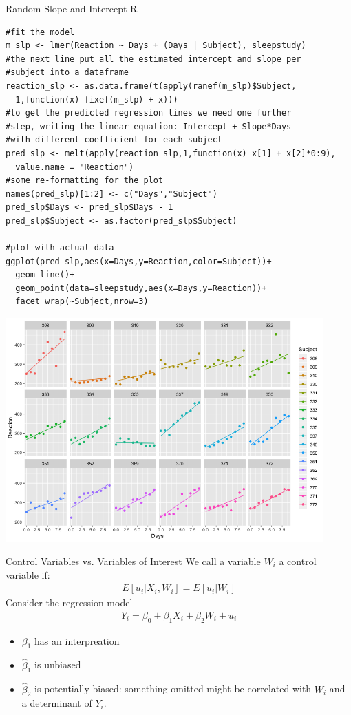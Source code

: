 \begin{frame}[fragile]{Random Slope and Intercept R}
\tiny
\begin{verbatim}
#fit the model
m_slp <- lmer(Reaction ~ Days + (Days | Subject), sleepstudy)
#the next line put all the estimated intercept and slope per
#subject into a dataframe
reaction_slp <- as.data.frame(t(apply(ranef(m_slp)$Subject,
  1,function(x) fixef(m_slp) + x)))
#to get the predicted regression lines we need one further
#step, writing the linear equation: Intercept + Slope*Days
#with different coefficient for each subject
pred_slp <- melt(apply(reaction_slp,1,function(x) x[1] + x[2]*0:9),
  value.name = "Reaction")
#some re-formatting for the plot
names(pred_slp)[1:2] <- c("Days","Subject")
pred_slp$Days <- pred_slp$Days - 1
pred_slp$Subject <- as.factor(pred_slp$Subject)

#plot with actual data
ggplot(pred_slp,aes(x=Days,y=Reaction,color=Subject))+
  geom_line()+
  geom_point(data=sleepstudy,aes(x=Days,y=Reaction))+
  facet_wrap(~Subject,nrow=3)
\end{verbatim}
\end{frame}

\begin{frame}%
\begin{center}
\includegraphics[width=4.8in]{./resources/random_slope_intercept.png}
\end{center}
\end{frame}

\begin{frame}{Control Variables vs. Variables of Interest}
We call a variable $W_i$ a control variable if:
\begin{align*}
E[u_i | X_i, W_i] = E[u_i | W_i]
\end{align*}
Consider the regression model
\begin{align*}
Y_i = \beta_0 + \beta_1 X_i + \beta_2 W_i + u_i
\end{align*}
\begin{itemize}
    \item $\beta_1$ has an interpreation
    \item $\widehat{\beta}_1$ is unbiased
    \item $\widehat{\beta}_2$ is potentially biased: something omitted might be correlated with $W_i$ and a determinant of $Y_i$. 
\end{itemize}
\end{frame}


